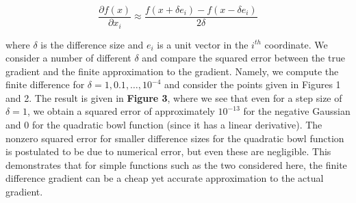 \documentclass[10pt,psamsfonts]{amsart}
\theoremstyle{definition}
\theoremstyle{remark}
\numberwithin{equation}{section}
\begin{document}
$$\frac{\partial f(x)}{\partial x_i} \approx \frac{f(x + \delta e_i) - f(x - \delta e_i)}{2\delta}$$

where $\delta$ is the difference size and $e_i$ is a unit vector in the $i^{th}$ coordinate. We consider a number of different $\delta$ and compare the squared error between the true gradient and the finite approximation to the gradient. Namely, we compute the finite difference for $\delta = 1, 0.1, \dots, 10^{-4}$ and consider the points given in Figures 1 and 2. The result is given in {\bf Figure 3}, where we see that even for a step size of $\delta = 1$, we obtain a squared error of approximately $10^{-13}$ for the negative Gaussian and 0 for the quadratic bowl function (since it has a linear derivative). The nonzero squared error for smaller difference sizes for the quadratic bowl function is postulated to be due to numerical error, but even these are negligible. This demonstrates that for simple functions such as the two considered here, the finite difference gradient can be a cheap yet accurate approximation to the actual gradient.
\end{document}
